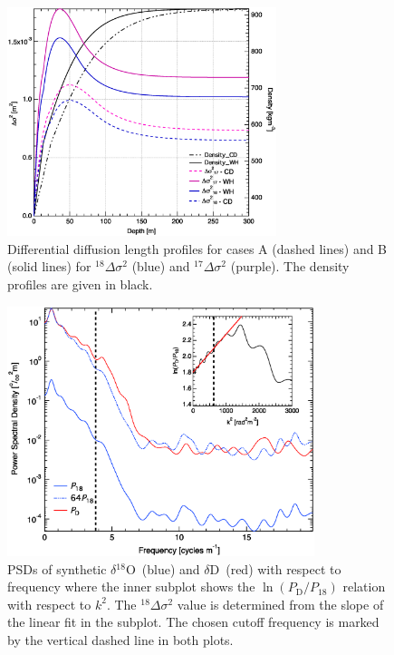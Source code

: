\documentclass[11pt, draftcls, onecolumn]{IEEEtran} %
\numberwithin{equation}{section}
\numberwithin{table}{section}
\numberwithin{figure}{section}
\newcommand{\delOx}{$\delta{}^{18}\mathrm{O}$}
\newcommand{\delD}{$\delta\mathrm{D}$}
\begin{document}
\begin{figure}[]	
\vspace*{2mm}	
\begin{center}		
	\includegraphics[width=0.7\textwidth]{Figure_7}		
	\caption{Differential diffusion length profiles for cases A (dashed lines) and B 
		(solid lines) for ${}^{18}\Delta\sigma^2$  (blue) and ${}^{17}\Delta\sigma^2$ (purple).
		The density profiles are given in black.} 		
	\label{fig:diff_diffusion_example}	
\end{center}
\end{figure}



\begin{figure}[]	
\vspace*{2mm}	
\begin{center}		
	\includegraphics[width=0.8\textwidth]{Figure_8}		
	\caption{PSDs of synthetic \delOx~(blue) and \delD~(red) with respect to frequency where
		the inner subplot shows the $\ln \left({P_\mathrm{D}}/{P_{18}}\right)$ relation with respect to  $k^2$. 
		The ${}^{18}\Delta\sigma^2$ value is determined from the slope of the linear fit in the subplot.
		The chosen cutoff frequency is marked by the vertical dashed line in both plots.} 		
	\label{fig:spectral_diff_diffusion_example}	
\end{center}
\end{figure}
\end{document}
